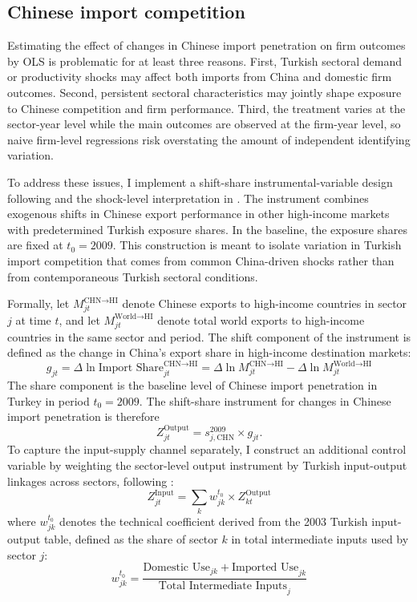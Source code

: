 ﻿\documentclass[12pt]{article}
\begin{document}
\subsection{Chinese import competition}
\label{sec:data_treatment}

Estimating the effect of changes in Chinese import penetration on firm outcomes by OLS is problematic for at least three reasons. First, Turkish sectoral demand or productivity shocks may affect both imports from China and domestic firm outcomes. Second, persistent sectoral characteristics may jointly shape exposure to Chinese competition and firm performance. Third, the treatment varies at the sector-year level while the main outcomes are observed at the firm-year level, so naive firm-level regressions risk overstating the amount of independent identifying variation.

To address these issues, I implement a shift-share instrumental-variable design following \textcite{autorTradeAdjustmentWorkerLevel2014} and the shock-level interpretation in \textcite{borusyakQuasiExperimentalShiftShareResearch2022}. The instrument combines exogenous shifts in Chinese export performance in other high-income markets with predetermined Turkish exposure shares. In the baseline, the exposure shares are fixed at $t_0 = 2009$. This construction is meant to isolate variation in Turkish import competition that comes from common China-driven shocks rather than from contemporaneous Turkish sectoral conditions.

Formally, let $M_{jt}^{\text{CHN} \to \text{HI}}$ denote Chinese exports to high-income countries in sector $j$ at time $t$, and let $M_{jt}^{\text{World} \to \text{HI}}$ denote total world exports to high-income countries in the same sector and period. The shift component of the instrument is defined as the change in China's export share in high-income destination markets:
\[
g_{jt} = \Delta \ln \text{Import Share}_{jt}^{\text{CHN} \to \text{HI}} = \Delta \ln M_{jt}^{\text{CHN} \to \text{HI}} - \Delta \ln M_{jt}^{\text{World} \to \text{HI}}
\]
The share component is the baseline level of Chinese import penetration in Turkey in period $t_0 = 2009$. The shift-share instrument for changes in Chinese import penetration is therefore
\[
Z_{jt}^{\text{Output}} = s_{j,\text{CHN}}^{2009} \times g_{jt}.
\]
To capture the input-supply channel separately, I construct an additional control variable by weighting the sector-level output instrument by Turkish input-output linkages across sectors, following \textcite{amitiTradeLiberalizationIntermediate2007}:
\[
Z_{jt}^{\text{Input}} = \sum_k w_{jk}^{t_0} \times Z_{kt}^{\text{Output}}
\]
where $w_{jk}^{t_0}$ denotes the technical coefficient derived from the 2003 Turkish input-output table, defined as the share of sector $k$ in total intermediate inputs used by sector $j$:
\[
w_{jk}^{t_0} = \frac{\text{Domestic Use}_{jk} + \text{Imported Use}_{jk}}{\text{Total Intermediate Inputs}_j}
\]
\end{document}
